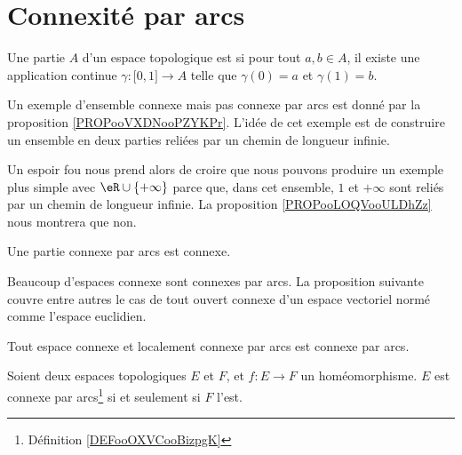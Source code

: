 
\section{Connexité par arcs}

\begin{definition}      \label{DEFooOXVCooBizpgK}
	Une partie \( A\) d'un espace topologique est  si pour tout \( a,b \in A\), il existe une application continue \( \gamma\colon \mathopen[ 0 , 1 \mathclose]\to A\) telle que \( \gamma(0)=a\) et \( \gamma(1)=b\).
\end{definition}

\begin{normaltext}
	Un exemple d'ensemble connexe mais pas connexe par arcs est donné par la proposition \ref{PROPooVXDNooPZYKPr}. L'idée de cet exemple est de construire un ensemble en deux parties reliées par un chemin de longueur infinie.

	Un espoir fou nous prend alors de croire que nous pouvons produire un exemple plus simple avec \( \eR\cup\{ +\infty \}\) parce que, dans cet ensemble, \( 1\) et \( +\infty\) sont reliés par un chemin de longueur infinie. La proposition \ref{PROPooLOQVooULDhZz} nous montrera que non.
\end{normaltext}


\begin{lemma}		\label{LEMooQPYMooRKVSrv}
	Une partie connexe par arcs est connexe.
\end{lemma}

Beaucoup d'espaces connexe sont connexes par arcs. La proposition suivante couvre entre autres le cas de tout ouvert connexe d'un espace vectoriel normé comme l'espace euclidien.

\begin{proposition}       \label{PROPooYFDBooHbBjzF}
	Tout espace connexe et localement connexe par arcs est connexe par arcs.
\end{proposition}


\begin{lemma}       \label{LEMooTVQMooFxrFaT}
	Soient deux espaces topologiques \( E\) et \( F\), et \( f : E\to F\) un homéomorphisme. \( E\) est connexe par arcs\footnote{Définition \ref{DEFooOXVCooBizpgK}} si et
	seulement si \( F\) l'est.
\end{lemma}

